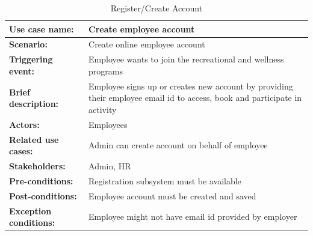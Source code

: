 \begin{table}[h!t]
    \caption{Register/Create Account}
    \begin{center}
    \small %
    \begin{tabularx}{\textwidth}{|l|X|}
    \hline
    \rule{0pt}{24pt}  \textbf{Use case name:} & Create employee account \\
    \hline
    \rule{0pt}{24pt}  \textbf{Scenario:} & Create online employee account \\
    \hline
    \rule{0pt}{24pt}  \textbf{Triggering event:} & Employee wants to join the recreational and wellness programs \\
    \hline
    \rule{0pt}{24pt}  \textbf{Brief description:} & Employee signs up or creates new account by providing their employee email id to access, book and participate in activity \\
    \hline
    \rule{0pt}{24pt}  \textbf{Actors:} & Employees \\
    \hline
    \rule{0pt}{24pt}  \textbf{Related use cases:} & Admin can create account on behalf of employee \\
    \hline
    \rule{0pt}{24pt}  \textbf{Stakeholders:} & Admin, HR \\
    \hline
    \rule{0pt}{24pt}  \textbf{Pre-conditions:} & Registration subsystem must be available \\
    \hline
    \rule{0pt}{24pt}  \textbf{Post-conditions:} & Employee account must be created and saved \\
    \hline
    \rule{0pt}{24pt}  \textbf{Exception conditions:} & Employee might not have email id provided by employer \\
    \hline
    \end{tabularx}
    \end{center}
    \label{tab:createAccount}
    \end{table}
\FloatBarrier

